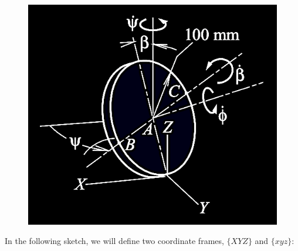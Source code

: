 \documentclass[12pt, letterpaper]{../assignment}
\begin{document}
\begin{figure}[H]
    \centering
    \includegraphics[scale=0.8,frame]{images/Q4_44.png}
\end{figure}

In the following sketch, we will define two coordinate frames, $\{XYZ\}$ and $\{xyz\}$:
\end{document}
